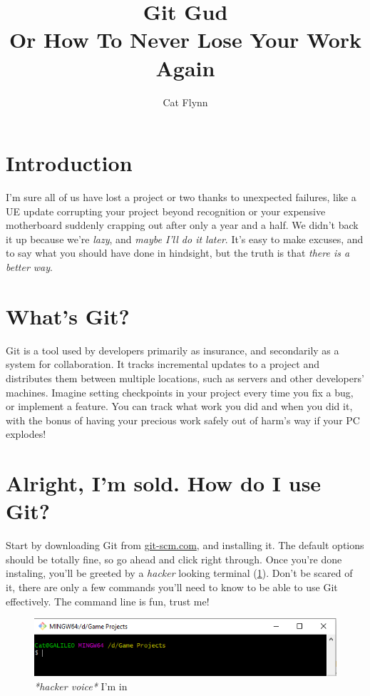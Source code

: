 \documentclass{article}
\begin{document}
\title{%
    Git Gud \\
    \large Or How To Never Lose Your Work Again}
\author{Cat Flynn}

\maketitle
{}
\newpage
\tableofcontents
\newpage
{}

\section{Introduction}
I'm sure all of us have lost a project or two thanks to unexpected failures, like a UE update corrupting your project beyond recognition or your expensive motherboard suddenly crapping out after only a year and a half. We didn't back it up because we're \textit{lazy}, and \textit{maybe I'll do it later}. It's easy to make excuses, and to say what you should have done in hindsight, but the truth is that \textit{there is a better way}.

\section{What's Git?}
Git is a tool used by developers primarily as insurance, and secondarily as a system for collaboration. It tracks incremental updates to a project and distributes them between multiple locations, such as servers and other developers' machines. Imagine setting checkpoints in your project every time you fix a bug, or implement a feature. You can track what work you did and when you did it, with the bonus of having your precious work safely out of harm's way if your PC explodes!

\section{Alright, I'm sold. How do I use Git?}
Start by downloading Git from \href{https://git-scm.com/}{git-scm.com}, and installing it. The default options should be totally fine, so go ahead and click right through. Once you're done instaling, you'll be greeted by a \textit{hacker} looking terminal (\ref{fig:terminal}). Don't be scared of it, there are only a few commands you'll need to know to be able to use Git effectively. The command line is fun, trust me!

\begin{figure}
    \includegraphics[width=\linewidth]{images/terminal.png}
    \caption{\textit{*hacker voice*} I'm in}
    \label{fig:terminal}
\end{figure}
\end{document}
